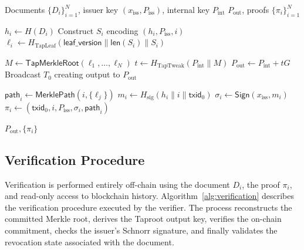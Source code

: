 \documentclass[preprint,12pt]{elsarticle}
\begin{document}
\begin{algorithm}[t]
\caption{Batch Commitment and Proof Generation}
\label{alg:p2tr_commit}
\begin{algorithmic}[1]
\Require Documents $\{D_i\}_{i=1}^{N}$, issuer key $(x_{\mathrm{iss}}, P_{\mathrm{iss}})$, internal key $P_{\mathrm{int}}$
\Ensure $P_{\mathrm{out}}$, proofs $\{\pi_i\}_{i=1}^{N}$

    \State $h_i \gets H(D_i)$
    \State Construct $S_i$ encoding $(h_i, P_{\mathrm{iss}}, i)$
    \State $\ell_i \gets H_{\text{TapLeaf}}(\textsf{leaf\_version} \parallel \textsf{len}(S_i) \parallel S_i)$
\EndFor

\State $M \gets \textsf{TapMerkleRoot}(\ell_1,\ldots,\ell_N)$
\State $t \gets H_{\text{TapTweak}}(P_{\mathrm{int}} \parallel M)$
\State $P_{\mathrm{out}} \gets P_{\mathrm{int}} + tG$
\State Broadcast $T_0$ creating output to $P_{\mathrm{out}}$

    \State $\mathsf{path}_i \gets \textsf{MerklePath}(i, \{\ell_j\})$
    \State $m_i \gets H_{\mathrm{sig}}(h_i \parallel i \parallel \mathsf{txid}_0)$
    \State $\sigma_i \gets \textsf{Sign}(x_{\mathrm{iss}}, m_i)$
    \State $\pi_i \gets (\mathsf{txid}_0, i, P_{\mathrm{iss}}, \sigma_i, \mathsf{path}_i)$
\EndFor

\State \Return $P_{\mathrm{out}}, \{\pi_i\}$
\end{algorithmic}
\end{algorithm}

\subsection{Verification Procedure}
\label{sec:verification_procedure}

Verification is performed entirely off-chain using the document $D_i$, the proof $\pi_i$, and read-only access to blockchain history. 
Algorithm~\ref{alg:verification} describes the verification procedure executed by the verifier. 
The process reconstructs the committed Merkle root, derives the Taproot output key, verifies the on-chain commitment, checks the issuer's Schnorr signature, and finally validates the revocation state associated with the document.
\end{document}
